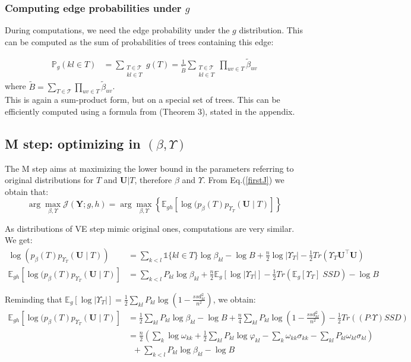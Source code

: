 \documentclass[11pt,a4paper]{article}
\newcommand{\argmax}{\arg\!\max}
\newcommand{\Ybf}{\boldsymbol{Y}}
\newcommand{\Ubf}{\boldsymbol{U}}
\newcommand{\Esp}{\mathds{E}}
\newcommand{\had}{\boldsymbol{\cdot}}
\begin{document}
\subsubsection{Computing edge probabilities under $g$}
During computations, we need the edge probability under the $g$ distribution. This can be computed as the sum of probabilities of trees containing this edge:

\begin{align*}
\mathds{P}_g(kl \in T)  &= \sum_{\substack{T  \in \mathcal{T} \\ kl \in T }} g(T) =\frac{1}{\widetilde{B}} \sum_{\substack{T  \in \mathcal{T} \\ kl \in T }} \prod_{uv \in T} \widetilde{\beta}_{uv}
\end{align*}
where $\displaystyle \widetilde{B}= \sum_{T \in \mathcal{T} }\prod_{uv \in T}  \widetilde{\beta}_{uv}$.\\

 This is again a sum-product form, but on a special set of trees. This can be efficiently computed using a formula from \citet{kirshner} (Theorem 3), stated in the appendix.
 
 
 \subsection{M step: optimizing in $(\beta, \Upsilon)$}
 The M step aims at maximizing the lower bound in the parameters referring to original distributions for $T$ and $\Ubf|T$, therefore $\beta$ and $\Upsilon$. From Eq.(\ref{firstJ}) we obtain that: 
$$ \argmax_{\beta, \Upsilon} \mathcal{J}(\Ybf ; g,h) =\argmax_{\beta, \Upsilon} \left\{ \Esp_{gh} [\log (p_\beta(T)p_{\Upsilon_T}(\Ubf\mid T) ]\right\} $$

As distributions of VE step mimic original ones, computations are very similar. We get:
\begin{align*}
\log (p_\beta(T)p_{\Upsilon_T}(\Ubf\mid T))  &= \sum_{k<l} \mathds{1}\{kl \in T\} \log \beta_{kl} - \log B + \frac{n}{2}\log |\Upsilon_T| - \frac{1}{2}Tr(\Upsilon_T \Ubf^\intercal \Ubf)\\
\Esp_{gh} [\log (p_\beta(T)p_{\Upsilon_T}(\Ubf\mid T) ] &= \sum_{k<l} P_{kl} \log\beta_{kl} +\frac{n}{2} \Esp_g[\log |\Upsilon_T|] -\frac{1}{2} Tr(\Esp_g [\Upsilon_T] \; SSD)- \log B
\end{align*}

Reminding that $\Esp_g[\log |\Upsilon_{T}|]= \frac{1}{2}\sum _{kl} P_{kl}  \log \left(1-\frac{ssd_{kl}^2}{n^2}\right)$,  we obtain:
\begin{align*}
\Esp_{gh} [\log (p_\beta(T)p_{\Upsilon_T}(\Ubf\mid T) ] &=\frac{1}{2}\sum_{kl} P_{kl} \log  \beta_{kl} - \log B + \frac{n}{4} \sum_{kl} P_{kl} \log\left(1-\frac{ssd_{kl}^2}{n^2}\right)  - \frac{1}{2}Tr( (P \had \Upsilon) SSD)\\
&= \frac{n}{2}\left( \sum_k \log \omega_{kk}  + \frac{1}{2} \sum_{kl} P_{kl} \log \varphi_{kl} - \sum_{k} \omega_{kk} \sigma_{kk} - \sum_{kl} P_{kl} \omega_{kl} \sigma_{kl}\right)\\
& \;\; +\sum_{k<l} P_{kl} \log  \beta_{kl} - \log B 
\end{align*}
 
\end{document}
